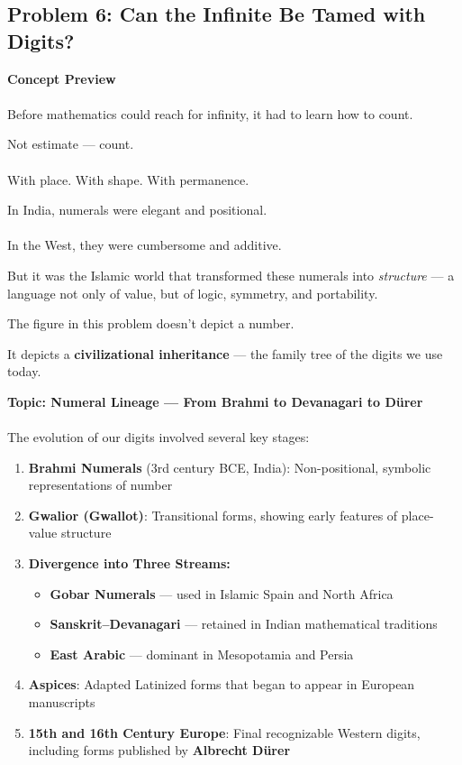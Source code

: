 \documentclass[9pt]{article}
\begin{document}
\newpage

\subsection*{Problem 6: Can the Infinite Be Tamed with Digits?}

\textbf{Concept Preview} \\\\
Before mathematics could reach for infinity, it had to learn how to count.

Not estimate — count. \\\\
With place. With shape. With permanence.

In India, numerals were elegant and positional. \\\\
In the West, they were cumbersome and additive.

But it was the Islamic world that transformed these numerals into \textit{structure} — a language not only of value, but of logic, symmetry, and portability.

The figure in this problem doesn’t depict a number.

It depicts a \textbf{civilizational inheritance} — the family tree of the digits we use today.

\vspace{1em}

\textbf{Topic: Numeral Lineage — From Brahmi to Devanagari to Dürer} \\\\
The evolution of our digits involved several key stages:

\begin{enumerate}
    \item \textbf{Brahmi Numerals} (3rd century BCE, India): Non-positional, symbolic representations of number
    \item \textbf{Gwalior (Gwallot)}: Transitional forms, showing early features of place-value structure
    \item \textbf{Divergence into Three Streams:}
    \begin{itemize}
        \item \textbf{Gobar Numerals} — used in Islamic Spain and North Africa
        \item \textbf{Sanskrit–Devanagari} — retained in Indian mathematical traditions
        \item \textbf{East Arabic} — dominant in Mesopotamia and Persia
    \end{itemize}
    \item \textbf{Aspices}: Adapted Latinized forms that began to appear in European manuscripts
    \item \textbf{15th and 16th Century Europe}: Final recognizable Western digits, including forms published by \textbf{Albrecht Dürer}
\end{enumerate}
\end{document}
